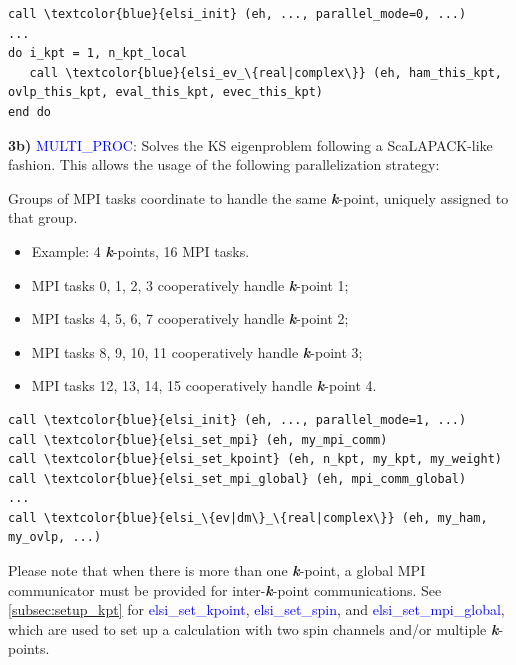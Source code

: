\documentclass{report}
\begin{document}
\begin{tcolorbox}
\begin{Verbatim}[commandchars=\\\{\}]
call \textcolor{blue}{elsi_init} (eh, ..., parallel_mode=0, ...)
...
do i_kpt = 1, n_kpt_local
   call \textcolor{blue}{elsi_ev_\{real|complex\}} (eh, ham_this_kpt, ovlp_this_kpt, eval_this_kpt, evec_this_kpt)
end do
\end{Verbatim}
\end{tcolorbox}

\textbf{3b)} \textcolor{blue}{MULTI\_PROC}: Solves the KS eigenproblem following a ScaLAPACK-like fashion. This allows the usage of the following parallelization strategy:

Groups of MPI tasks coordinate to handle the same \textbf{\textit{k}}-point, uniquely assigned to that group.
\begin{itemize}
\item Example: 4 \textbf{\textit{k}}-points, 16 MPI tasks.
\item MPI tasks 0, 1, 2, 3 cooperatively handle \textbf{\textit{k}}-point 1;
\item MPI tasks 4, 5, 6, 7 cooperatively handle \textbf{\textit{k}}-point 2;
\item MPI tasks 8, 9, 10, 11 cooperatively handle \textbf{\textit{k}}-point 3;
\item MPI tasks 12, 13, 14, 15 cooperatively handle \textbf{\textit{k}}-point 4.
\end{itemize}

\begin{tcolorbox}
\begin{Verbatim}[commandchars=\\\{\}]
call \textcolor{blue}{elsi_init} (eh, ..., parallel_mode=1, ...)
call \textcolor{blue}{elsi_set_mpi} (eh, my_mpi_comm)
call \textcolor{blue}{elsi_set_kpoint} (eh, n_kpt, my_kpt, my_weight)
call \textcolor{blue}{elsi_set_mpi_global} (eh, mpi_comm_global)
...
call \textcolor{blue}{elsi_\{ev|dm\}_\{real|complex\}} (eh, my_ham, my_ovlp, ...)
\end{Verbatim}
\end{tcolorbox}

Please note that when there is more than one \textbf{\textit{k}}-point, a global MPI communicator must be provided for inter-\textbf{\textit{k}}-point communications. See \ref{subsec:setup_kpt} for \textcolor{blue}{elsi\_set\_kpoint}, \textcolor{blue}{elsi\_set\_spin}, and \textcolor{blue}{elsi\_set\_mpi\_global}, which are used to set up a calculation with two spin channels and/or multiple \textbf{\textit{k}}-points.
\end{document}
